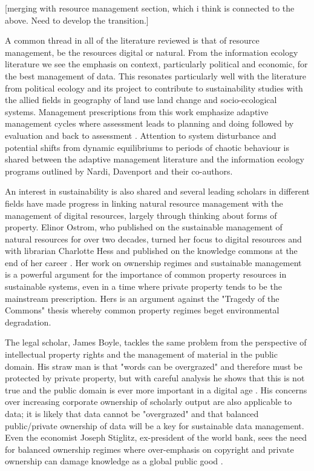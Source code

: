 [merging with resource management section, which i think is connected to the above. Need to develop the transition.]

A common thread in all of the literature reviewed is that of resource management, be the resources digital or natural. From the information ecology literature we see the emphasis on context, particularly political and economic, for the best management of data. This resonates particularly well with the literature from political ecology and its project to contribute to sustainability studies with the allied fields in geography of land use land change and socio-ecological systems. Management prescriptions from this work emphasize adaptive management cycles where assessment leads to planning and doing followed by evaluation and back to assessment \citep{holling_1978,liu_etal_2007}. Attention to system disturbance and potential shifts from dynamic equilibriums to periods of chaotic behaviour is shared between the adaptive management literature and the information ecology programs outlined by Nardi, Davenport and their co-authors. 

An interest in sustainability is also shared and several leading scholars in different fields have made progress in linking natural resource management with the management of digital resources, largely through thinking about forms of property. Elinor Ostrom, who published on the sustainable management of natural resources for over two decades, turned her focus to digital resources and with librarian Charlotte Hess and published on the knowledge commons at the end of her career \citep{hess_2006}. Her work on ownership regimes and sustainable management is a powerful argument for the importance of common property resources in sustainable systems, even in a time where private property tends to be the mainstream prescription. Hers is an argument against the "Tragedy of the Commons" thesis whereby common property regimes beget environmental degradation.

The legal scholar, James Boyle, tackles the same problem from the perspective of intellectual property rights and the management of material in the public domain. His straw man is that "words can be overgrazed" and therefore must be protected by private property, but with careful analysis he shows that this is not true and the public domain is ever more important in a digital age \citep[][footnote 15 on p. 5]{boyle_2003}. His concerns over increasing corporate ownership of scholarly output are also applicable to data; it is likely that data cannot be "overgrazed" and that balanced public/private ownership of data will be a key for sustainable data management. Even the economist Joseph Stiglitz, ex-president of the world bank, sees the need for balanced ownership regimes where over-emphasis on copyright and private ownership can damage knowledge as a global public good \citep{stiglitz_1999}.


